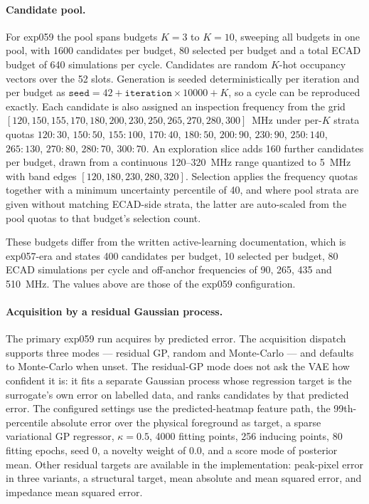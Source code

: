 \paragraph{Candidate pool.} For exp059 the pool spans budgets $K = 3$ to $K = 10$, sweeping all
budgets in one pool, with 1600 candidates per budget, 80 selected per budget and a total ECAD budget
of 640 simulations per cycle. Candidates are random $K$-hot occupancy vectors over the 52 slots.
Generation is seeded deterministically per iteration and per budget as
$\texttt{seed} = 42 + \texttt{iteration} \times 10000 + K$, so a cycle can be reproduced exactly.
Each candidate is also assigned an inspection frequency from the grid
$[120, 150, 155, 170, 180, 200, 230, 250, 265, 270, 280, 300]$~MHz under per-$K$ strata quotas
$120{:}30$, $150{:}50$, $155{:}100$, $170{:}40$, $180{:}50$, $200{:}90$, $230{:}90$, $250{:}140$,
$265{:}130$, $270{:}80$, $280{:}70$, $300{:}70$. An exploration slice adds 160 further candidates per
budget, drawn from a continuous 120--320~MHz range quantized to 5~MHz with band edges
$[120, 180, 230, 280, 320]$. Selection applies the frequency quotas together with a minimum
uncertainty percentile of 40, and where pool strata are given without matching ECAD-side strata, the
latter are auto-scaled from the pool quotas to that budget's selection count.

These budgets differ from the written active-learning documentation, which is exp057-era and states
400 candidates per budget, 10 selected per budget, 80 ECAD simulations per cycle and off-anchor
frequencies of 90, 265, 435 and 510~MHz. The values above are those of the exp059 configuration.

\paragraph{Acquisition by a residual Gaussian process.} The primary exp059 run acquires by predicted
error. The acquisition dispatch supports three modes --- residual GP, random and Monte-Carlo --- and
defaults to Monte-Carlo when unset. The residual-GP mode does not ask the VAE how confident it is: it
fits a separate Gaussian process whose regression target is the surrogate's own error on labelled
data, and ranks candidates by that predicted error. The configured settings use the predicted-heatmap
feature path, the 99th-percentile absolute error over the physical foreground as target, a sparse
variational GP regressor, $\kappa = 0.5$, 4000 fitting points, 256 inducing points, 80 fitting
epochs, seed 0, a novelty weight of 0.0, and a score mode of posterior mean. Other residual targets
are available in the implementation: peak-pixel error in three variants, a structural target, mean
absolute and mean squared error, and impedance mean squared error.

